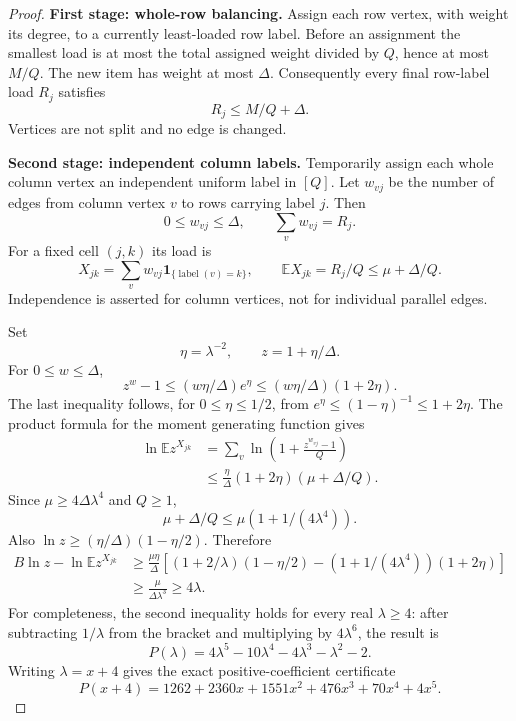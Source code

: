 \documentclass[11pt,letterpaper]{article}
\numberwithin{equation}{section}
\theoremstyle{definition}\newtheorem{definition}[theorem]{Definition}
\theoremstyle{remark}\newtheorem{remark}[theorem]{Remark}
\begin{document}
\begin{proof}
\textbf{First stage: whole-row balancing.}
Assign each row vertex, with weight its degree, to a currently least-loaded
row label. Before an assignment the smallest load is at most the total
assigned weight divided by $Q$, hence at most $M/Q$. The new item has
weight at most $\Delta$. Consequently every final row-label load $R_j$
satisfies
\begin{equation}
 R_j\le M/Q+\Delta.\label{eq:row-balance}
\end{equation}
Vertices are not split and no edge is changed.

\textbf{Second stage: independent column labels.}
Temporarily assign each whole column vertex an independent uniform label
in $[Q]$. Let $w_{vj}$ be the number of edges from column vertex $v$
to rows carrying label $j$. Then
\[
 0\le w_{vj}\le\Delta,\qquad \sum_vw_{vj}=R_j.
\]
For a fixed cell $(j,k)$ its load is
\[
 X_{jk}=\sum_v w_{vj}\mathbf1_{\{\operatorname{label}(v)=k\}},
 \qquad
 \mathbb EX_{jk}=R_j/Q\le\mu+\Delta/Q.
\]
Independence is asserted for column vertices, not for individual parallel
edges.

Set
\[
 \eta=\lambda^{-2},\qquad z=1+\eta/\Delta.
\]
For $0\le w\le\Delta$,
\[
 z^w-1\le (w\eta/\Delta)e^\eta
 \le (w\eta/\Delta)(1+2\eta).
\]
The last inequality follows, for $0\le\eta\le1/2$, from
$e^\eta\le(1-\eta)^{-1}\le1+2\eta$.
The product formula for the moment generating function gives
\begin{align}
 \ln\mathbb E z^{X_{jk}}
 &=\sum_v\ln\left(1+\frac{z^{w_{vj}}-1}{Q}\right)\\
 &\le\frac{\eta}{\Delta}(1+2\eta)(\mu+\Delta/Q).\label{eq:mgf}
\end{align}
Since $\mu\ge4\Delta\lambda^4$ and $Q\ge1$,
\[
 \mu+\Delta/Q\le\mu(1+1/(4\lambda^4)).
\]
Also $\ln z\ge(\eta/\Delta)(1-\eta/2)$. Therefore
\begin{align}
 B\ln z-\ln\mathbb Ez^{X_{jk}}
 &\ge\frac{\mu\eta}{\Delta}
 \left[(1+2/\lambda)(1-\eta/2)
 -(1+1/(4\lambda^4))(1+2\eta)\right]\\
 &\ge\frac{\mu}{\Delta\lambda^3}\ge4\lambda.
 \label{eq:gap}
\end{align}
For completeness, the second inequality holds for every real $\lambda\ge4$:
after subtracting $1/\lambda$ from the bracket and multiplying by
$4\lambda^6$, the result is
\[
 P(\lambda)=4\lambda^5-10\lambda^4-4\lambda^3-\lambda^2-2.
\]
Writing $\lambda=x+4$ gives the exact positive-coefficient certificate
\[
 P(x+4)=1262+2360x+1551x^2+476x^3+70x^4+4x^5.
\]


\end{proof}
\end{document}
